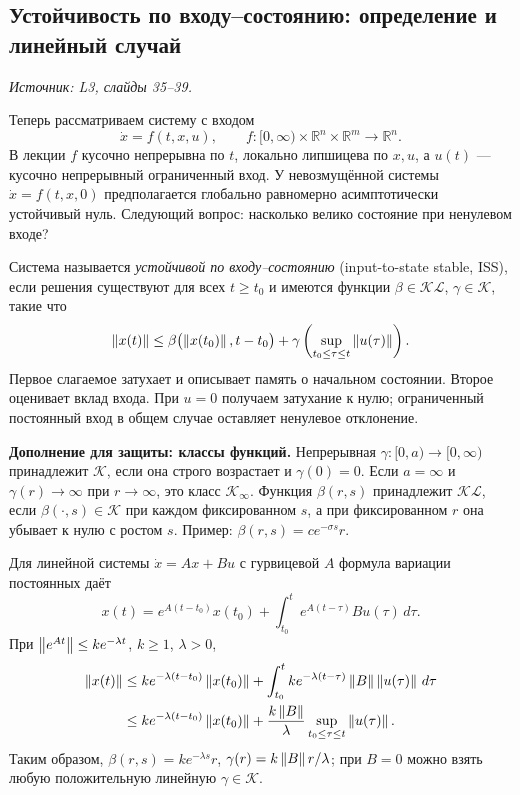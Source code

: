 \subsection{Устойчивость по входу--состоянию: определение и линейный случай}
\label{subsec:stability-iss-definition}
\noindent\textit{Источник: L3, слайды 35--39.}

Теперь рассматриваем систему с входом
\[
 \dot x=f(t,x,u),\qquad
 f:[0,\infty)\times\mathbb R^n\times\mathbb R^m\to\mathbb R^n.
\]
В лекции $f$ кусочно непрерывна по $t$, локально липшицева
по $x,u$, а $u(t)$ --- кусочно непрерывный ограниченный вход.
У невозмущённой системы $\dot x=f(t,x,0)$ предполагается
глобально равномерно асимптотически устойчивый нуль.
Следующий вопрос: насколько велико состояние при ненулевом входе?

Система называется \emph{устойчивой по входу--состоянию}
(input-to-state stable, ISS), если решения существуют для всех
$t\ge t_0$ и имеются функции $\beta\in\mathcal{KL}$,
$\gamma\in\mathcal K$, такие что
\[
 \left\lVert x(t)\right\rVert\le
 \beta\bigl(\left\lVert x(t_0)\right\rVert,t-t_0\bigr)
 +\gamma\left(\sup_{t_0\le\tau\le t}\left\lVert u(\tau)\right\rVert\right).
\]
Первое слагаемое затухает и описывает память о начальном состоянии.
Второе оценивает вклад входа. При $u=0$ получаем затухание к нулю;
ограниченный постоянный вход в общем случае оставляет ненулевое
отклонение.

\textbf{Дополнение для защиты: классы функций.}
Непрерывная $\gamma:[0,a)\to[0,\infty)$ принадлежит
$\mathcal K$, если она строго возрастает и $\gamma(0)=0$.
Если $a=\infty$ и $\gamma(r)\to\infty$ при $r\to\infty$,
это класс $\mathcal K_\infty$.
Функция $\beta(r,s)$ принадлежит $\mathcal{KL}$, если
$\beta(\cdot,s)\in\mathcal K$ при каждом фиксированном $s$,
а при фиксированном $r$ она убывает к нулю с ростом $s$.
Пример: $\beta(r,s)=ce^{-\sigma s}r$.

Для линейной системы $\dot x=Ax+Bu$ с гурвицевой $A$
формула вариации постоянных даёт
\[
 x(t)=e^{A(t-t_0)}x(t_0)
       +\int_{t_0}^{t}e^{A(t-\tau)}Bu(\tau)\,d\tau.
\]
При $\left\lVert e^{At}\right\rVert\le ke^{-\lambda t}$, $k\ge1$, $\lambda>0$,
\[
 \begin{aligned}
 \left\lVert x(t)\right\rVert
 &\le ke^{-\lambda(t-t_0)}\left\lVert x(t_0)\right\rVert
  +\int_{t_0}^{t}ke^{-\lambda(t-\tau)}\left\lVert B\right\rVert\left\lVert u(\tau)\right\rVert\,d\tau\\
 &\le ke^{-\lambda(t-t_0)}\left\lVert x(t_0)\right\rVert
  +\frac{k\left\lVert B\right\rVert}{\lambda}
    \sup_{t_0\le\tau\le t}\left\lVert u(\tau)\right\rVert.
 \end{aligned}
\]
Таким образом, $\beta(r,s)=ke^{-\lambda s}r$,
$\gamma(r)=k\left\lVert B\right\rVert r/\lambda$; при $B=0$ можно взять
любую положительную линейную $\gamma\in\mathcal K$.

